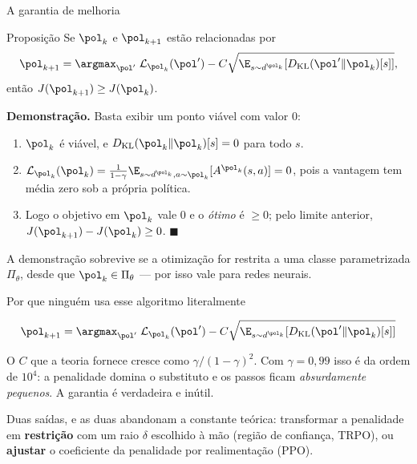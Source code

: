 \documentclass[aspectratio=169, 10pt]{beamer}
\newcommand{\thv}{\theta}
\newcommand{\polk}{\pol_{k}}
\newcommand{\polnovo}{\pol'}
\newcommand{\Dkl}{D_{\mathrm{KL}}}
\newcommand{\Lsub}[1]{\mathcal{L}_{#1}}
\begin{document}
\begin{frame}{A garantia de melhoria}

  \begin{teobox}{Proposição}
    Se $\polk$ e $\pol_{k+1}$ estão relacionadas por
    \[
      \pol_{k+1} = \argmax_{\polnovo}\;
        \Lsub{\polk}(\polnovo) - C\sqrt{\E_{s\sim d^{\polk}}[\Dkl(\polnovo\|\polk)[s]]},
    \]
    então $J(\pol_{k+1}) \ge J(\polk)$.
  \end{teobox}

  \textbf{Demonstração.} Basta exibir um ponto viável com valor $0$:
  \begin{enumerate}\setlength{\itemsep}{0ex}
    \item $\polk$ é viável, e $\Dkl(\polk\|\polk)[s] = 0$ para todo $s$.
    \item $\Lsub{\polk}(\polk) = \frac{1}{1-\gamma}\E_{s\sim d^{\polk},a\sim\polk}[A^{\polk}(s,a)] = 0$,
      pois a vantagem tem média zero sob a própria política.
    \item Logo o objetivo em $\polk$ vale $0$ e o \emph{ótimo} é $\ge 0$; pelo limite
      anterior, $J(\pol_{k+1}) - J(\polk) \ge 0$. \hfill$\blacksquare$
  \end{enumerate}

  \begin{ideiabox}
    A demonstração sobrevive se a otimização for restrita a uma classe parametrizada
    $\Pi_{\thv}$, desde que $\polk \in \Pi_{\thv}$ --- por isso vale para redes neurais.
  \end{ideiabox}
\end{frame}

\begin{frame}{Por que ninguém usa esse algoritmo literalmente}

  \[
    \pol_{k+1} = \argmax_{\polnovo}\;
      \Lsub{\polk}(\polnovo) - C\sqrt{\E_{s\sim d^{\polk}}[\Dkl(\polnovo\|\polk)[s]]}
  \]

  \begin{alertabox}
    O $C$ que a teoria fornece cresce como $\gamma/(1-\gamma)^2$. Com
    $\gamma = 0{,}99$ isso é da ordem de $10^4$: a penalidade domina o substituto e
    os passos ficam \emph{absurdamente pequenos}. A garantia é verdadeira e inútil.
  \end{alertabox}

  \begin{ideiabox}
    Duas saídas, e as duas abandonam a constante teórica: transformar a penalidade em
    \textbf{restrição} com um raio $\delta$ escolhido à mão (região de confiança,
    TRPO), ou \textbf{ajustar} o coeficiente da penalidade por realimentação (PPO).
  \end{ideiabox}
\end{frame}
\end{document}
